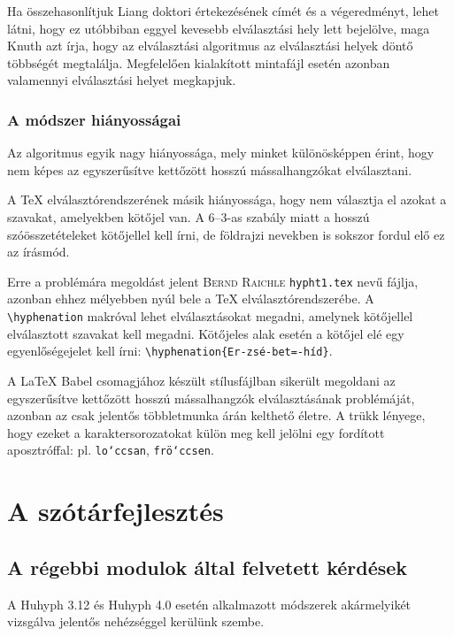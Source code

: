 \documentclass[12pt]{article}
\begin{document}
Ha összehasonlítjuk Liang doktori értekezésének címét és a végeredményt,
lehet látni, hogy ez utóbbiban eggyel kevesebb elválasztási hely lett
bejelölve, maga Knuth azt írja, hogy az elválasztási algoritmus az
elválasztási helyek döntő többségét megtalálja. Megfelelően kialakított
mintafájl esetén azonban valamennyi elválasztási helyet megkapjuk.


\subsubsection{A módszer hiányosságai}

Az algoritmus egyik nagy hiányossága, mely minket különösképpen érint,
hogy nem képes az egyszerűsítve kettőzött hosszú mássalhangzókat elválasztani.

A \TeX{} elválasztórendszerének másik hiányossága, hogy nem választja
el azokat a szavakat, amelyekben kötőjel van. A 6--3-as szabály miatt
a hosszú szóösszetételeket kötőjellel kell írni, de földrajzi nevekben
is sokszor fordul elő ez az írásmód.

Erre a problémára megoldást jelent \textsc{Bernd Raichle} \texttt{hypht1.tex}
nevű fájlja, azonban ehhez mélyebben nyúl bele a \TeX{} elválasztórendszerébe.
A \texttt{\textbackslash{}hyphenation} makróval lehet elválasztásokat
megadni, amelynek kötőjellel elválasztott szavakat kell megadni. Kötőjeles
alak esetén a kötőjel elé egy egyenlőségejelet kell írni: \texttt{\textbackslash{}hyphenation\{Er-zsé-bet=-híd\}}.

A \LaTeX{} Babel csomagjához készült stílusfájlban sikerült megoldani
az egyszerűsítve kettőzött hosszú mássalhangzók elválasztásának problémáját,
azonban az csak jelentős többletmunka árán kelthető életre. A trükk
lényege, hogy ezeket a karaktersorozatokat külön meg kell jelölni
egy fordított aposztróffal: pl. \texttt{lo`ccsan}, \texttt{frö`ccsen}.


\section{A szótárfejlesztés}


\subsection{A régebbi modulok által felvetett kérdések}

A Huhyph 3.12 és Huhyph 4.0 esetén alkalmazott módszerek akármelyikét
vizsgálva jelentős nehézséggel kerülünk szembe.
\end{document}
